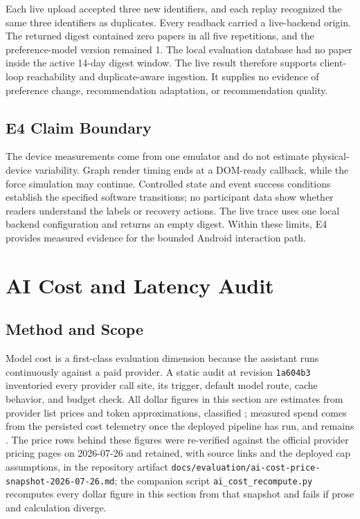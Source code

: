 Each live upload accepted three new identifiers, and each replay recognized the same three identifiers as duplicates.
Every readback carried a live-backend origin.
The returned digest contained zero papers in all five repetitions, and the preference-model version remained 1.
The local evaluation database had no paper inside the active 14-day digest window.
The live result therefore supports client-loop reachability and duplicate-aware ingestion.
It supplies no evidence of preference change, recommendation adaptation, or recommendation quality.

\subsection{E4 Claim Boundary}

The device measurements come from one emulator and do not estimate physical-device variability.
Graph render timing ends at a DOM-ready callback, while the force simulation may continue.
Controlled state and event success conditions establish the specified software transitions; no participant data show whether readers understand the labels or recovery actions.
The live trace uses one local backend configuration and returns an empty digest.
Within these limits, E4 provides measured evidence for the bounded Android interaction path.

\section{AI Cost and Latency Audit}

\subsection{Method and Scope}

Model cost is a first-class evaluation dimension because the assistant runs continuously against a paid provider.
A static audit at revision \texttt{1a604b3} inventoried every provider call site, its trigger, default model route, cache behavior, and budget check.
All dollar figures in this section are estimates from provider list prices and token approximations, classified \observed{}; measured spend comes from the persisted cost telemetry once the deployed pipeline has run, and remains \pending.
The price rows behind these figures were re-verified against the official provider pricing pages on 2026-07-26 and retained, with source links and the deployed cap assumptions, in the repository artifact \texttt{docs/evaluation/ai-cost-price-snapshot-2026-07-26.md}; the companion script \texttt{ai\_cost\_recompute.py} recomputes every dollar figure in this section from that snapshot and fails if prose and calculation diverge.

